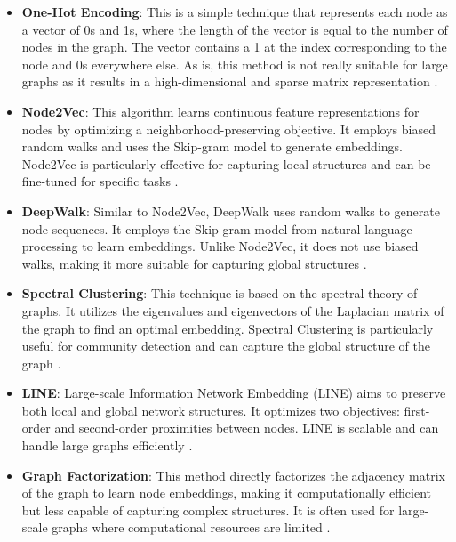     \begin{itemize}
        \item \textbf{One-Hot Encoding}: This is a simple technique that represents each node as a vector of 0s and 1s, where the length of the vector is equal to the number of nodes in the graph. The vector contains a 1 at the index corresponding to the node and 0s everywhere else. As is, this method is not really suitable for large graphs as it results in a high-dimensional and sparse matrix representation \cite{KG22}.
        
        \item \textbf{Node2Vec}: This algorithm learns continuous feature representations for nodes by optimizing a neighborhood-preserving objective. It employs biased random walks and uses the Skip-gram model to generate embeddings. Node2Vec is particularly effective for capturing local structures and can be fine-tuned for specific tasks \cite{Node2vec16}.
        
        \item \textbf{DeepWalk}: Similar to Node2Vec, DeepWalk uses random walks to generate node sequences. It employs the Skip-gram model from natural language processing to learn embeddings. Unlike Node2Vec, it does not use biased walks, making it more suitable for capturing global structures \cite{Deepwalk14}.
        
        \item \textbf{Spectral Clustering}: This technique is based on the spectral theory of graphs. It utilizes the eigenvalues and eigenvectors of the Laplacian matrix of the graph to find an optimal embedding. Spectral Clustering is particularly useful for community detection and can capture the global structure of the graph \cite{SpectralNetworks13} \cite{SemiSupervisedClassificationSpectralConvGCN16}.
        
        \item \textbf{LINE}: Large-scale Information Network Embedding (LINE) aims to preserve both local and global network structures. It optimizes two objectives: first-order and second-order proximities between nodes. LINE is scalable and can handle large graphs efficiently \cite{LINEEmbedding15}.
        
        \item \textbf{Graph Factorization}: This method directly factorizes the adjacency matrix of the graph to learn node embeddings, making it computationally efficient but less capable of capturing complex structures. It is often used for large-scale graphs where computational resources are limited \cite{KG22}.
        
    \end{itemize}


